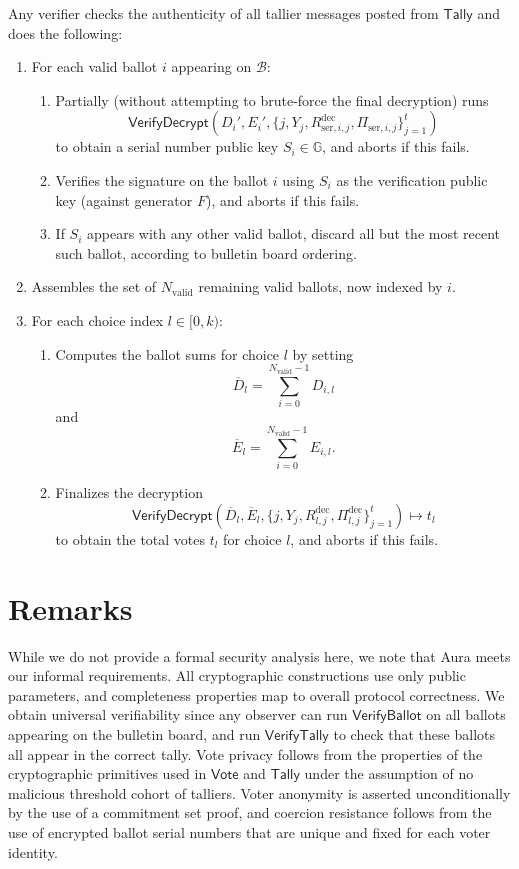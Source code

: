 \documentclass{llncs}
\newcommand{\G}{\mathbb{G}}
\newcommand{\func}[1]{\mathsf{#1}}
\begin{document}
Any verifier checks the authenticity of all tallier messages posted from $\func{Tally}$ and does the following:
\begin{enumerate}
    \item For each valid ballot $i$ appearing on $\mathcal{B}$:
    \begin{enumerate}
        \item Partially (without attempting to brute-force the final decryption) runs \[ \func{VerifyDecrypt}(D_i', E_i', \{j, Y_j, R_{\text{ser},i,j}^{\text{dec}}, \Pi_{\text{ser},i,j}\}_{j=1}^t) \] to obtain a serial number public key $S_i \in \G$, and aborts if this fails.
        \item Verifies the signature on the ballot $i$ using $S_i$ as the verification public key (against generator $F$), and aborts if this fails.
        \item If $S_i$ appears with any other valid ballot, discard all but the most recent such ballot, according to bulletin board ordering.
    \end{enumerate}
    \item Assembles the set of $N_{\text{valid}}$ remaining valid ballots, now indexed by $i$.
    \item For each choice index $l \in [0,k)$:
    \begin{enumerate}
        \item Computes the ballot sums for choice $l$ by setting \[ \overline{D}_l = \sum_{i=0}^{N_{\text{valid}}-1} D_{i,l} \] and \[ \overline{E}_l = \sum_{i=0}^{N_{\text{valid}}-1} E_{i,l}. \]
        \item Finalizes the decryption \[ \func{VerifyDecrypt}(\overline{D}_l, \overline{E}_l, \{j, Y_j, R_{l,j}^{\text{dec}}, \Pi_{l,j}^{\text{dec}}\}_{j=1}^t) \mapsto t_l \] to obtain the total votes $t_l$ for choice $l$, and aborts if this fails.
    \end{enumerate}
\end{enumerate}


\section{Remarks}

While we do not provide a formal security analysis here, we note that Aura meets our informal requirements.
All cryptographic constructions use only public parameters, and completeness properties map to overall protocol correctness.
We obtain universal verifiability since any observer can run $\func{VerifyBallot}$ on all ballots appearing on the bulletin board, and run $\func{VerifyTally}$ to check that these ballots all appear in the correct tally.
Vote privacy follows from the properties of the cryptographic primitives used in $\func{Vote}$ and $\func{Tally}$ under the assumption of no malicious threshold cohort of talliers.
Voter anonymity is asserted unconditionally by the use of a commitment set proof, and coercion resistance follows from the use of encrypted ballot serial numbers that are unique and fixed for each voter identity.
\end{document}
